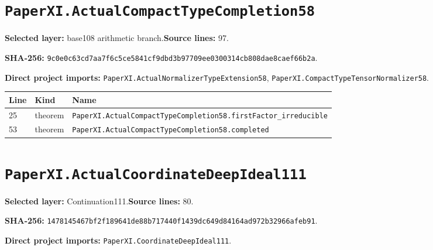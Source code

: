 \documentclass[10pt,oneside]{book}
\begin{document}
\section{\texorpdfstring{\nolinkurl{PaperXI.ActualCompactTypeCompletion58}}{PaperXI.ActualCompactTypeCompletion58}}\label{module:PaperXI.ActualCompactTypeCompletion58}

\textbf{Selected layer:} base108 arithmetic branch.\quad\textbf{Source lines:} 97.\par\textbf{SHA-256:} {\scriptsize\nolinkurl{9c0e0c63cd7aa7f6c5ce5841cf9dbd3b97709ee0300314cb808dae8caef66b2a}}.


\textbf{Direct project imports:} \nolinkurl{PaperXI.ActualNormalizerTypeExtension58}, \nolinkurl{PaperXI.CompactTypeTensorNormalizer58}.

\begin{longtable}{@{}p{}p{}p{}@{}}\toprule Line&Kind&Name\\\midrule\endhead

25&theorem&\nolinkurl{PaperXI.ActualCompactTypeCompletion58.firstFactor_irreducible}\\

53&theorem&\nolinkurl{PaperXI.ActualCompactTypeCompletion58.completed}\\

\bottomrule\end{longtable}

\section{\texorpdfstring{\nolinkurl{PaperXI.ActualCoordinateDeepIdeal111}}{PaperXI.ActualCoordinateDeepIdeal111}}\label{module:PaperXI.ActualCoordinateDeepIdeal111}

\textbf{Selected layer:} Continuation111.\quad\textbf{Source lines:} 80.\par\textbf{SHA-256:} {\scriptsize\nolinkurl{1478145467bf2f189641de88b717440f1439dc649d84164ad972b32966afeb91}}.


\textbf{Direct project imports:} \nolinkurl{PaperXI.CoordinateDeepIdeal111}.
\end{document}
